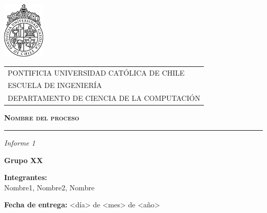 \begin{titlepage}
\includegraphics[width=2cm]{img/logo-puc-BLANCOYNEGRO.png} %
\vspace*{-2.2cm} %


\begin{tabular}{l}
\hspace{2cm} PONTIFICIA UNIVERSIDAD CATÓLICA DE CHILE\\
\hspace{2cm} ESCUELA DE INGENIERÍA\\
\hspace{2cm} DEPARTAMENTO DE CIENCIA DE LA COMPUTACIÓN\\
\end{tabular}

\begin{center}
\vspace{3cm}
{\scshape\Huge \textbf{Nombre del proceso} \par}
\rule{80mm}{0.1mm}

{\itshape\LARGE Informe 1 \par}
\vfill
{\Large \textbf{Grupo XX} \par}
\vspace{0.5cm}
{\large \textbf{Integrantes:}\\\normalsize Nombre1, Nombre2, Nombre \par} 


\medskip
\textbf{Fecha de entrega:} <día> de <mes> de <año>
\vspace{3cm}
\end{center}
\end{titlepage}
\newpage